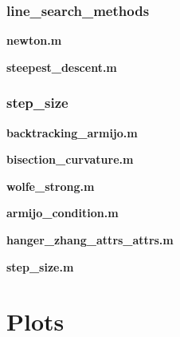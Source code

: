 \documentclass[a4paper,11pt]{article}
\numberwithin{equation}{section} %
\begin{document}
\subsubsection{line\_search\_methods}
\textbf{newton.m}

\textbf{steepest\_descent.m}


\subsubsection{step\_size}
\textbf{backtracking\_armijo.m}

\textbf{bisection\_curvature.m}

\textbf{wolfe\_strong.m}

\textbf{armijo\_condition.m}

\textbf{hanger\_zhang\_attrs\_attrs.m}

\textbf{step\_size.m}




\clearpage

\label{plots}
\section{Plots}



\clearpage





\end{document}
